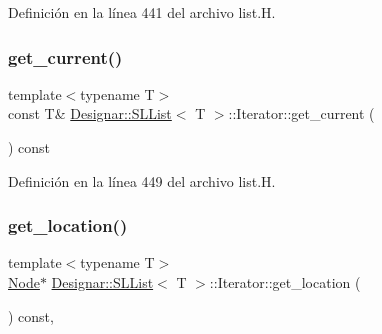 Definición en la línea 441 del archivo list.\+H.

\mbox{\label{class_designar_1_1_s_l_list_1_1_iterator_aa29dad95637eeaf662bcc3a8bb02d77a}} 
\subsubsection{\texorpdfstring{get\+\_\+current()}{get\_current()}\hspace{0.1cm}{\footnotesize\ttfamily [2/2]}}
{\footnotesize\ttfamily template$<$typename T$>$ \\
const T\& \hyperlink{class_designar_1_1_s_l_list}{Designar\+::\+S\+L\+List}$<$ T $>$\+::Iterator\+::get\+\_\+current (\begin{DoxyParamCaption}{ }\end{DoxyParamCaption}) const\hspace{0.3cm}{\ttfamily [inline]}}



Definición en la línea 449 del archivo list.\+H.

\mbox{\label{class_designar_1_1_s_l_list_1_1_iterator_af994c3d4b1f178e55d8b68d3b7a515cf}} 
\subsubsection{\texorpdfstring{get\+\_\+location()}{get\_location()}}
{\footnotesize\ttfamily template$<$typename T$>$ \\
\hyperlink{class_designar_1_1_node_s_l_list_a41963019ada1025099e3259207a3de96}{Node}$\ast$ \hyperlink{class_designar_1_1_s_l_list}{Designar\+::\+S\+L\+List}$<$ T $>$\+::Iterator\+::get\+\_\+location (\begin{DoxyParamCaption}{ }\end{DoxyParamCaption}) const\hspace{0.3cm}{\ttfamily [inline]}, {\ttfamily [protected]}}




